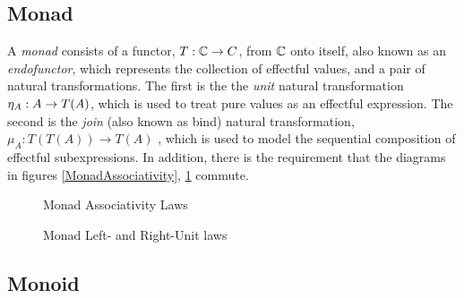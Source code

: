 \documentclass{Report}
\begin{document}
\subsection{Monad}
A \textit{monad} consists of a functor, $T: \mathbb{C} \rightarrow C$, from $\mathbb{C}$ onto itself, also known as an \textit{endofunctor}, which represents the collection of effectful values, and a pair of natural transformations. The first is the the \textit{unit} natural transformation $\eta_{A}: A\rightarrow T(A)$, which is used to treat pure values as an effectful expression. The second is the \textit{join} (also known as bind) natural transformation, $\mu_{A}: T(T(A)) \rightarrow T(A)$ ,  which is used to model the sequential composition of effectful subexpressions. In addition, there is the requirement that the diagrams in figures \ref{MonadAssociativity}, \ref{MonadUnits} commute.


\begin{figure}
\begin{framed}  
        \centering
        \begin{minipage}{0.45\textwidth}
            \centering
            \caption{Monad Associativity Laws}
            \label{MonadAssociativity}
        \end{minipage}\hfill
        \begin{minipage}{0.45\textwidth}
            \centering
            \caption{Monad Left- and Right-Unit laws}
            \label{MonadUnits}
        \end{minipage}
\end{framed}
\end{figure}


\subsection{Monoid}
\end{document}
